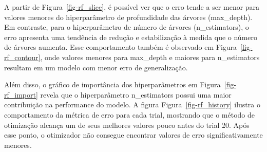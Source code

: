 \documentclass[
  12pt,
  a4paper,
]{scrreprt}
\begin{document}
\vspace{12pt}

A partir de Figura~\ref{fig-rf_slice}, é possível ver que o erro tende a
ser menor para valores menores do hiperparâmetro de profundidade das
árvores (max\_depth). Em contraste, para o hiperparâmetro de número de
árvores (n\_estimators), o erro apresenta uma tendência de redução e
estabilização à medida que o número de árvores aumenta. Esse
comportamento também é observado em Figura~\ref{fig-rf_contour}, onde
valores menores para max\_depth e maiores para n\_estimators resultam em
um modelo com menor erro de generalização.

\vspace{12pt}

Além disso, o gráfico de importância dos hiperparâmetros em
Figura~\ref{fig-rf_import} revela que o hiperparâmetro n\_estimators
possui uma maior contribuição na performance do modelo. A figura
Figura~\ref{fig-rf_history} ilustra o comportamento da métrica de erro
para cada trial, mostrando que o método de otimização alcança um de seus
melhores valores pouco antes do trial 20. Após esse ponto, o otimizador
não consegue encontrar valores de erro significativamente menores.
\end{document}
